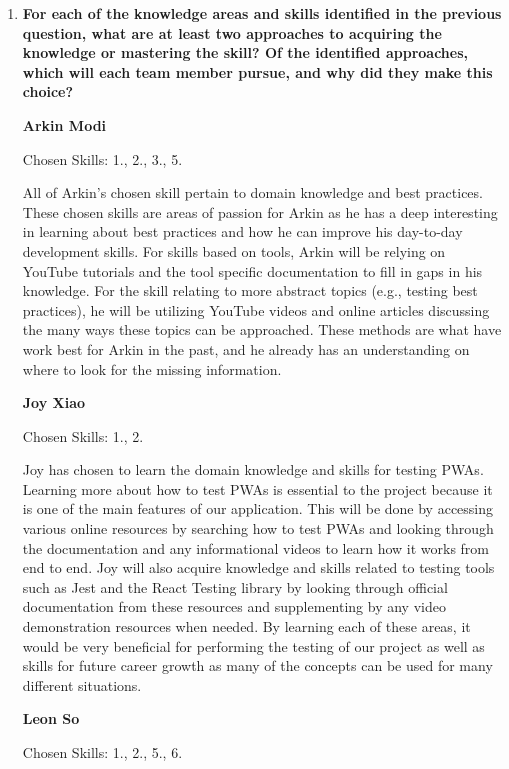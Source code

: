 \documentclass[12pt, titlepage]{article}
\begin{document}
\begin{enumerate}
	\item \textbf{For each of the knowledge areas and skills identified in the previous question, what are at least
		      two approaches to acquiring the knowledge or mastering the skill? Of the identified approaches,
		      which will each team member pursue, and why did they make this choice?}

	      \textbf{Arkin Modi}

	      Chosen Skills: 1., 2., 3., 5.

	      All of Arkin's chosen skill pertain to domain knowledge and best practices. These chosen skills are
	      areas of passion for Arkin as he has a deep interesting in learning about best practices and how he
	      can improve his day-to-day development skills. For skills based on tools, Arkin will be relying on
	      YouTube tutorials and the tool specific documentation to fill in gaps in his knowledge. For the
	      skill relating to more abstract topics (e.g., testing best practices), he will be utilizing YouTube
	      videos and online articles discussing the many ways these topics can be approached. These methods
	      are what have work best for Arkin in the past, and he already has an understanding on where to look
	      for the missing information.

	      \textbf{Joy Xiao}

	      Chosen Skills: 1., 2.

	      Joy has chosen to learn the domain knowledge and skills for testing PWAs. Learning more about how
	      to test PWAs is essential to the project because it is one of the main features of our application.
	      This will be done by accessing various online resources by searching how to test PWAs and looking
	      through the documentation and any informational videos to learn how it works from end to end. Joy
	      will also acquire knowledge and skills related to testing tools such as Jest and the React Testing
	      library by looking through official documentation from these resources and supplementing by any
	      video demonstration resources when needed. By learning each of these areas, it would be very
	      beneficial for performing the testing of our project as well as skills for future career growth as
	      many of the concepts can be used for many different situations.

	      \textbf{Leon So}

	      Chosen Skills: 1., 2., 5., 6.


\end{enumerate}
\end{document}
